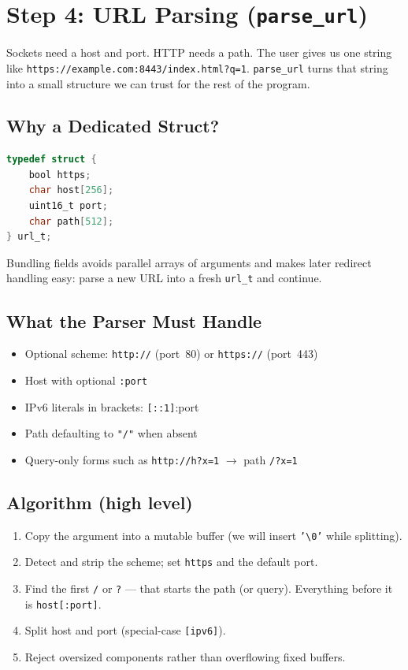 \section{Step 4: URL Parsing (\texttt{parse\_url})}

Sockets need a host and port. HTTP needs a path. The user gives us one string
like \texttt{https://example.com:8443/index.html?q=1}. \texttt{parse\_url}
turns that string into a small structure we can trust for the rest of the
program.

\subsection{Why a Dedicated Struct?}

\begin{lstlisting}[style=snippet,language=C]
typedef struct {
    bool https;
    char host[256];
    uint16_t port;
    char path[512];
} url_t;
\end{lstlisting}

Bundling fields avoids parallel arrays of arguments and makes later redirect
handling easy: parse a new URL into a fresh \texttt{url\_t} and continue.

\subsection{What the Parser Must Handle}

\begin{itemize}[leftmargin=1.4em]
    \item Optional scheme: \texttt{http://} (port~80) or \texttt{https://}
          (port~443)
    \item Host with optional \texttt{:port}
    \item IPv6 literals in brackets: \texttt{[::1]}:port
    \item Path defaulting to \texttt{"/"} when absent
    \item Query-only forms such as \texttt{http://h?x=1} $\rightarrow$ path
          \texttt{/?x=1}
\end{itemize}

\subsection{Algorithm (high level)}

\begin{enumerate}[leftmargin=1.4em]
    \item Copy the argument into a mutable buffer (we will insert
          \texttt{'\textbackslash0'} while splitting).
    \item Detect and strip the scheme; set \texttt{https} and the default port.
    \item Find the first \texttt{/} or \texttt{?} --- that starts the path
          (or query). Everything before it is \texttt{host[:port]}.
    \item Split host and port (special-case \texttt{[ipv6]}).
    \item Reject oversized components rather than overflowing fixed buffers.
\end{enumerate}

